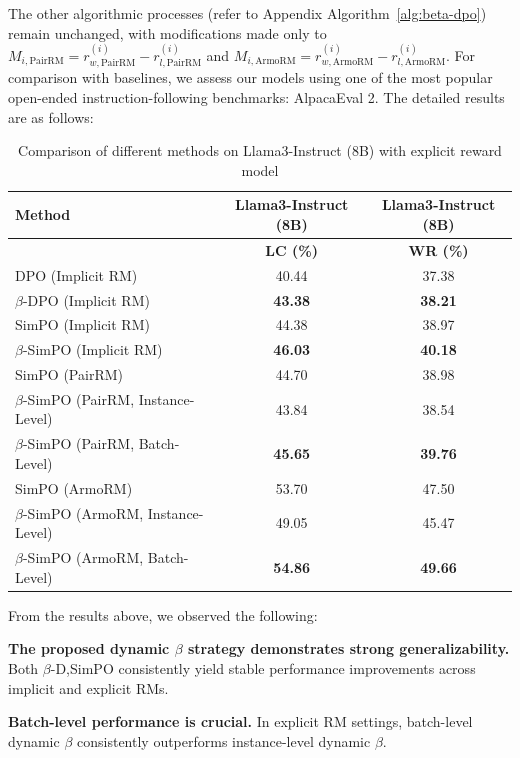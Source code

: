 {The other algorithmic processes (refer to Appendix Algorithm~\ref{alg:beta-dpo}) remain unchanged, with modifications made only to \(M_{i,\text{PairRM}}=r_{w,\text{PairRM}}^{(i)} - r_{l,\text{PairRM}}^{(i)}\) and \(M_{i,\text{ArmoRM}}=r_{w,\text{ArmoRM}}^{(i)} - r_{l,\text{ArmoRM}}^{(i)}\).} 
For comparison with baselines, we assess our models using one of the most popular open-ended instruction-following benchmarks: AlpacaEval 2.
The detailed results are as follows:

\begin{table}[h]
\centering
\caption{Comparison of different methods on Llama3-Instruct (8B) with explicit reward model}
\begin{tabular}{lcc}
\toprule
\textbf{Method} & \textbf{Llama3-Instruct (8B)} & \textbf{Llama3-Instruct (8B)} \\
\midrule
 & \textbf{LC (\%)} & \textbf{WR (\%)} \\
\midrule
DPO (Implicit RM) & 40.44 & 37.38 \\
$\beta$-DPO (Implicit RM) & \textbf{43.38} & \textbf{38.21} \\
\midrule
SimPO (Implicit RM) & 44.38 & 38.97 \\
$\beta$-SimPO (Implicit RM) & \textbf{46.03} & \textbf{40.18} \\
\midrule
SimPO (PairRM) & 44.70 & 38.98 \\
$\beta$-SimPO (PairRM, Instance-Level) & 43.84 & 38.54 \\
$\beta$-SimPO (PairRM, Batch-Level) & \textbf{45.65} & \textbf{39.76} \\
\midrule
SimPO (ArmoRM) & 53.70 & 47.50 \\
$\beta$-SimPO (ArmoRM, Instance-Level) & 49.05 & 45.47 \\
$\beta$-SimPO (ArmoRM, Batch-Level) & \textbf{54.86} & \textbf{49.66} \\
\bottomrule
\end{tabular}
\label{tab:comparison}
\end{table}

From the results above, we observed the following:

\textbf{The proposed dynamic $\beta$ strategy demonstrates strong generalizability.} Both $\beta$-{D,Sim}PO consistently yield stable performance improvements across implicit and explicit RMs.

\textbf{Batch-level performance is crucial.} In explicit RM settings, batch-level dynamic $\beta$ consistently outperforms instance-level dynamic $\beta$.

